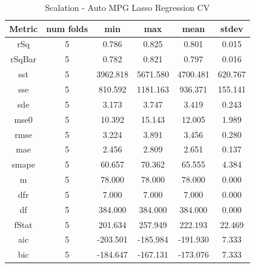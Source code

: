 \documentclass{article}
\begin{document}
\begin{table}[H]
\centering
\caption{Scalation - Auto MPG Lasso Regression CV}
\label{tab:Scalation - Auto MPG Lasso Regression CV}
\begin{tabular}{|c|c|c|c|c|c|}\hline
Metric & num folds & min & max & mean & stdev \\ \hline \hline
rSq & 5 & 0.786 & 0.825 & 0.801 & 0.015 \\ \hline
rSqBar & 5 & 0.782 & 0.821 & 0.797 & 0.016 \\ \hline
sst & 5 & 3962.818 & 5671.580 & 4700.481 & 620.767 \\ \hline
sse & 5 & 810.592 & 1181.163 & 936.371 & 155.141 \\ \hline
sde & 5 & 3.173 & 3.747 & 3.419 & 0.243 \\ \hline
mse0 & 5 & 10.392 & 15.143 & 12.005 & 1.989 \\ \hline
rmse & 5 & 3.224 & 3.891 & 3.456 & 0.280 \\ \hline
mae & 5 & 2.456 & 2.809 & 2.651 & 0.137 \\ \hline
smape & 5 & 60.657 & 70.362 & 65.555 & 4.384 \\ \hline
m & 5 & 78.000 & 78.000 & 78.000 & 0.000 \\ \hline
dfr & 5 & 7.000 & 7.000 & 7.000 & 0.000 \\ \hline
df & 5 & 384.000 & 384.000 & 384.000 & 0.000 \\ \hline
fStat & 5 & 201.634 & 257.949 & 222.193 & 22.469 \\ \hline
aic & 5 & -203.501 & -185.984 & -191.930 & 7.333 \\ \hline
bic & 5 & -184.647 & -167.131 & -173.076 & 7.333 \\ \hline
\end{tabular}
\end{table}
\end{document}

